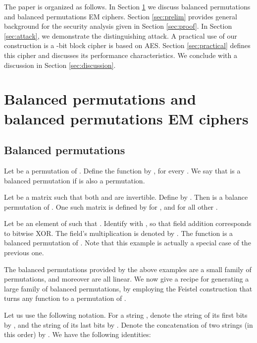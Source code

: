 \documentclass{llncs}
\begin{document}
The paper is organized as follows. In Section \ref{sec:Balanced} we discuss 
balanced permutations and balanced permutations EM ciphers. Section \ref{sec:prelim} provides general background for the security analysis given in Section \ref{sec:proof}. In Section \ref{sec:attack}, we demonstrate the distinguishing attack. 
A practical use of our construction is a -bit block cipher is based on AES. Section \ref{sec:practical} defines this cipher and discusses its performance characteristics. We conclude with a discussion in Section \ref{sec:discussion}.


\section{Balanced permutations and balanced permutations EM ciphers}
\label{sec:Balanced}

\subsection{Balanced permutations}

\begin{definition} Let  be a permutation of . Define the function  by , for every . We say that  is a balanced permutation if  is also a permutation.
\end{definition}

\begin{example}
Let  be a matrix such that both  and  are invertible. Define  by . Then  is a balance permutation of .
One such matrix is defined by  for ,  and  for all other .
\end{example}

\begin{example}
Let  be an element of  such that . Identify  with , so that field addition corresponds to bitwise XOR. The field's multiplication is denoted by . The function  is a balanced permutation of .
Note that this example is actually a special case of the previous one.
\end{example}
The balanced permutations provided by the above examples are a small family of permutations, and moreover are all linear. We now give a recipe for generating a large family of balanced permutations, by employing the Feistel construction that turns any function  to a permutation of .

Let us use the following notation. For a string , denote the string of its first  bits by , and the string of its last  bits by . Denote the concatenation of two strings  (in this order) by . We have the following identities:
\end{document}
